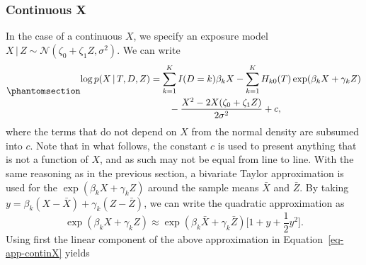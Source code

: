 \documentclass[
  letterpaper,
  paper=240mm:170mm,
  twoside=true,
  open=right,
  fontsize=10pt,
  pagesize=false,
  BCOR=15mm,
  DIV=14,
  headinclude=true,
  footinclude=false,
  headsepline=on]{scrbook}
\newcommand{\given}{\,|\,}
\begin{document}
\subsubsection*{Continuous X}\label{continuous-x-1}

In the case of a continuous \(X\), we specify an exposure model
\(X \given Z \sim \mathcal{N}(\zeta_0 + \zeta_1 Z, \sigma^2)\). We can
write \begin{equation}\phantomsection\label{eq-app-continX}{
\begin{aligned}
    \log p(X \given T, D, Z) &= \sum^K_{k = 1} I(D=k) \beta_k X - \sum^K_{k = 1} H_{k0}(T)\exp(\beta_k X + \gamma_k Z) \\
    &\qquad - \frac{X^2 - 2X ( \zeta_0 + \zeta_1 Z)}{2\sigma^2} + c, 
\end{aligned}
}\end{equation} where the terms that do not depend on \(X\) from the
normal density are subsumed into \(c\). Note that in what follows, the
constant \(c\) is used to present anything that is not a function of
\(X\), and as such may not be equal from line to line. With the same
reasoning as in the previous section, a bivariate Taylor approximation
is used for the \(\exp(\beta_k X + \gamma_k Z)\) around the sample means
\(\bar{X}\) and \(\bar{Z}\). By taking
\(y = \beta_k(X - \bar{X}) + \gamma_k(Z - \bar{Z})\), we can write the
quadratic approximation as \begin{equation*}
    \exp(\beta_k X + \gamma_k Z) \approx \exp(\beta_k \bar{X} + \gamma_k \bar{Z})\bigg[ 1 + y + \frac{1}{2}y^2 \bigg].
\end{equation*} Using first the linear component of the above
approximation in Equation~\ref{eq-app-continX} yields
\end{document}
